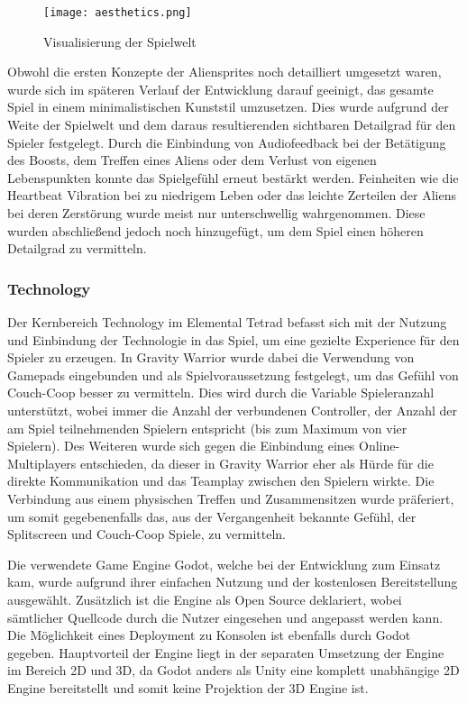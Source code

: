 \documentclass[11pt]{scrartcl}
\begin{document}
\begin{figure}[htp]
	\centering
	\texttt{[image: aesthetics.png]}
	\caption{Visualisierung der Spielwelt}
	\label{fig:aesthetics}
\end{figure}

 
Obwohl die ersten Konzepte der Aliensprites noch detailliert umgesetzt waren, wurde sich im späteren Verlauf der Entwicklung darauf geeinigt, das gesamte Spiel in einem minimalistischen Kunststil umzusetzen. Dies wurde aufgrund der Weite der Spielwelt und dem daraus resultierenden sichtbaren Detailgrad für den Spieler festgelegt.
Durch die Einbindung von Audiofeedback bei der Betätigung des Boosts, dem Treffen eines Aliens oder dem Verlust von eigenen Lebenspunkten konnte das Spielgefühl erneut bestärkt werden. Feinheiten wie die Heartbeat Vibration bei zu niedrigem Leben oder das leichte Zerteilen der Aliens bei deren Zerstörung wurde meist nur unterschwellig wahrgenommen. Diese wurden abschließend jedoch noch hinzugefügt, um dem Spiel einen höheren Detailgrad zu vermitteln.

\subsubsection{Technology}
\label{subsec:tech}
Der Kernbereich Technology im Elemental Tetrad befasst sich mit der Nutzung und Einbindung der Technologie in das Spiel, um eine gezielte Experience für den Spieler zu erzeugen\cite[~p.412]{S2014}. In Gravity Warrior wurde dabei die Verwendung von Gamepads eingebunden und als Spielvoraussetzung festgelegt, um das Gefühl von Couch-Coop besser zu vermitteln. Dies wird durch die Variable Spieleranzahl unterstützt, wobei immer die Anzahl der verbundenen Controller, der Anzahl der am Spiel teilnehmenden Spielern entspricht (bis zum Maximum von vier Spielern). Des Weiteren wurde sich gegen die Einbindung eines Online-Multiplayers entschieden, da dieser in Gravity Warrior eher als Hürde für die direkte Kommunikation und das Teamplay zwischen den Spielern wirkte. Die Verbindung aus einem physischen Treffen und Zusammensitzen wurde präferiert, um somit gegebenenfalls das, aus der Vergangenheit bekannte Gefühl, der Splitscreen und Couch-Coop Spiele, zu vermitteln.

Die verwendete Game Engine Godot, welche bei der Entwicklung zum Einsatz kam, wurde aufgrund ihrer einfachen Nutzung und der kostenlosen Bereitstellung ausgewählt. Zusätzlich ist die Engine als Open Source deklariert, wobei sämtlicher Quellcode durch die Nutzer eingesehen und angepasst werden kann. Die Möglichkeit eines Deployment zu Konsolen ist ebenfalls durch Godot gegeben. Hauptvorteil der Engine liegt in der separaten Umsetzung der Engine im Bereich 2D und 3D, da Godot anders als Unity eine komplett unabhängige 2D Engine bereitstellt und somit keine Projektion der 3D Engine ist\cite{G2019}.
\end{document}
